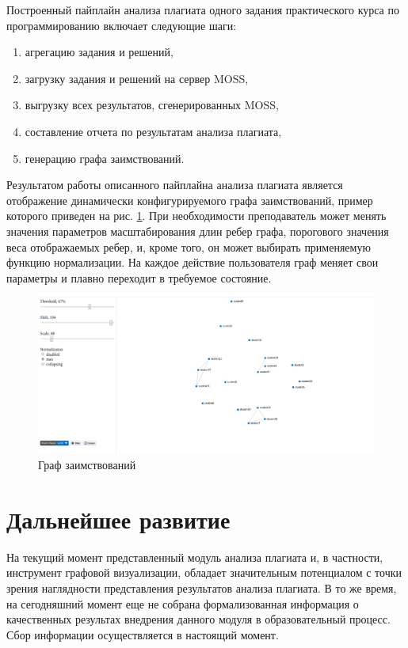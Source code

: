 \documentclass{article}
\begin{document}
Построенный пайплайн анализа плагиата одного задания практического курса по программированию включает следующие шаги:
\begin{enumerate}
    \item агрегацию задания и решений,
    \item загрузку задания и решений на сервер MOSS,
    \item выгрузку всех результатов, сгенерированных MOSS,
    \item составление отчета по результатам анализа плагиата,
    \item генерацию графа заимствований.
\end{enumerate}

Результатом работы описанного пайплайна анализа плагиата является отображение динамически конфигурируемого графа заимствований, пример которого приведен на рис. \ref{fig:graph}. При необходимости преподаватель может менять значения параметров масштабирования длин ребер графа, порогового значения веса отображаемых ребер, и, кроме того, он может выбирать применяемую функцию нормализации. На каждое действие пользователя граф меняет свои параметры и плавно переходит в требуемое состояние.

\begin{figure}[h!]
\centering
\includegraphics[width=1.0\textwidth]{graph.png}
\caption{Граф заимствований}
\label{fig:graph}
\end{figure}

\section{Дальнейшее развитие}

На текущий момент представленный модуль анализа плагиата и, в частности, инструмент графовой визуализации, обладает значительным потенциалом с точки зрения наглядности представления результатов анализа плагиата. В то же время, на сегодняшний момент еще не собрана формализованная информация о качественных результах внедрения данного модуля в образовательный процесс. Сбор информации осуществляется в настоящий момент.
\end{document}
